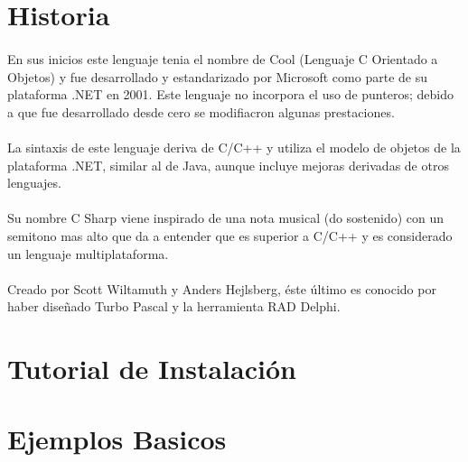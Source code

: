 \documentclass[11pt]{article} %
\begin{document}
\section{Historia}
\paragraph{ }
En sus inicios este lenguaje tenia el nombre de Cool (Lenguaje C Orientado a Objetos) y fue desarrollado y estandarizado por Microsoft como parte de su plataforma .NET en 2001. Este lenguaje no incorpora el uso de punteros; debido a que fue desarrollado desde cero se modifiacron algunas prestaciones.
\paragraph{ }
La sintaxis de este lenguaje deriva de C/C++ y utiliza el modelo de objetos de la plataforma .NET, similar al de Java, aunque incluye mejoras derivadas de otros lenguajes.
\paragraph{ }
Su nombre C Sharp viene inspirado de una nota musical (do sostenido) con un semitono mas alto que da a entender que es superior a  C/C++ y es considerado un lenguaje multiplataforma.
\paragraph{ }
Creado por Scott Wiltamuth y Anders Hejlsberg, éste último es conocido por haber diseñado Turbo Pascal y la herramienta RAD Delphi.

\section{Tutorial de Instalación}


\section{Ejemplos Basicos}
\end{document}
